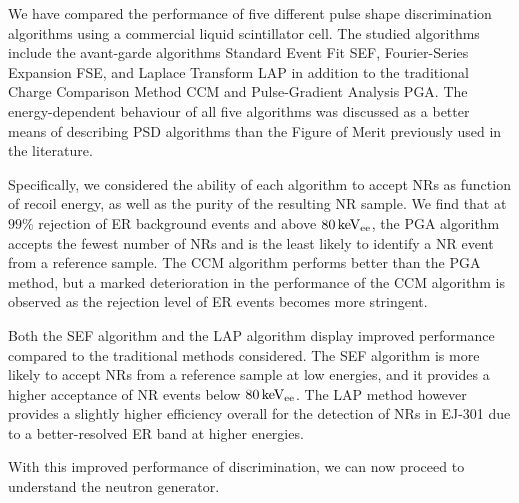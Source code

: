 We have compared the performance of five different pulse shape discrimination algorithms using a commercial liquid scintillator cell. The studied algorithms include the avant-garde algorithms Standard Event Fit SEF, Fourier-Series Expansion FSE, and Laplace Transform LAP in addition to the traditional Charge Comparison Method CCM and Pulse-Gradient Analysis PGA. The energy-dependent behaviour of all five algorithms was discussed as a better means of describing PSD algorithms than the Figure of Merit previously used in the literature.

Specifically, we considered the ability of each algorithm to accept NRs as function of recoil energy, as well as the purity of the resulting NR sample. We find that at $99\%$ rejection of ER background events and above $80\,\mathrm{keV_{ee}}$, the PGA algorithm accepts the fewest number of NRs and is the least likely to identify a NR event from a reference sample. The CCM algorithm performs better than the PGA method, but a marked deterioration in the performance of the CCM algorithm is observed as the rejection level of ER events becomes more stringent.

Both the SEF algorithm and the LAP algorithm display improved performance compared to the traditional methods considered. The SEF algorithm is more likely to accept NRs from a reference sample at low energies, and it provides a higher acceptance of NR events below $80\,\mathrm{keV_{ee}}$. The LAP method however provides a slightly higher efficiency overall for the detection of NRs in EJ-301 due to a better-resolved ER band at higher energies.

With this improved performance of discrimination, we can now proceed to understand the neutron generator.
